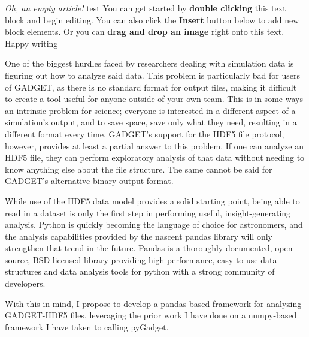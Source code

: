 \textit{Oh, an empty article!} 
test
You can get started by \textbf{double clicking} this text block and begin editing. You can also click the \textbf{Insert} button below to add new block elements. Or you can \textbf{drag and drop an image} right onto this text. Happy writing

One of the biggest hurdles faced by researchers dealing with simulation data is figuring out how to analyze said data.  This problem is particularly bad for users of GADGET, as there is no standard format for output files, making it difficult to create a tool useful for anyone outside of your own team.  This is in some ways an intrinsic problem for science; everyone is interested in a different aspect of a simulation’s output, and to save space, save only what they need, resulting in a different format every time.  GADGET’s support for the HDF5 file protocol, however, provides at least a partial answer to this problem.  If one can analyze an HDF5 file, they can perform exploratory analysis of that data without needing to know anything else about the file structure.  The same cannot be said for GADGET’s alternative binary output format.  

While use of the HDF5 data model provides a solid starting point, being able to read in a dataset is only the first step in performing useful, insight-generating analysis.  Python is quickly becoming the language of choice for astronomers, and the analysis capabilities provided by the nascent pandas library will only strengthen that trend in the future.  Pandas is a thoroughly documented, open-source, BSD-licensed library providing high-performance, easy-to-use data structures and data analysis tools for python with a strong community of developers.  

With this in mind, I propose to develop a pandas-based framework for analyzing GADGET-HDF5 files, leveraging the prior work I have done on a numpy-based framework I have taken to calling pyGadget.